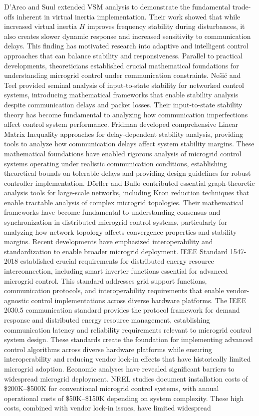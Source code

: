 \documentclass[12pt]{article}
\begin{document}
D'Arco and Suul \cite{darco2013} extended VSM analysis to demonstrate the fundamental trade-offs inherent in virtual inertia implementation. Their work showed that while increased virtual inertia $H$ improves frequency stability during disturbances, it also creates slower dynamic response and increased sensitivity to communication delays. This finding has motivated research into adaptive and intelligent control approaches that can balance stability and responsiveness. Parallel to practical developments, theoreticians established crucial mathematical foundations for understanding microgrid control under communication constraints. Nešić and Teel \cite{nesic2004} provided seminal analysis of input-to-state stability for networked control systems, introducing mathematical frameworks that enable stability analysis despite communication delays and packet losses. Their input-to-state stability theory has become fundamental to analyzing how communication imperfections affect control system performance. Fridman \cite{fridman2014} developed comprehensive Linear Matrix Inequality approaches for delay-dependent stability analysis, providing tools to analyze how communication delays affect system stability margins. These mathematical foundations have enabled rigorous analysis of microgrid control systems operating under realistic communication conditions, establishing theoretical bounds on tolerable delays and providing design guidelines for robust controller implementation. Dörfler and Bullo \cite{dorfler2013} contributed essential graph-theoretic analysis tools for large-scale networks, including Kron reduction techniques that enable tractable analysis of complex microgrid topologies. Their mathematical frameworks have become fundamental to understanding consensus and synchronization in distributed microgrid control systems, particularly for analyzing how network topology affects convergence properties and stability margins. Recent developments have emphasized interoperability and standardization to enable broader microgrid deployment. IEEE Standard 1547-2018 \cite{ieee1547} established crucial requirements for distributed energy resource interconnection, including smart inverter functions essential for advanced microgrid control. This standard addresses grid support functions, communication protocols, and interoperability requirements that enable vendor-agnostic control implementations across diverse hardware platforms. The IEEE 2030.5 communication standard \cite{ieee2030} provides the protocol framework for demand response and distributed energy resource management, establishing communication latency and reliability requirements relevant to microgrid control system design. These standards create the foundation for implementing advanced control algorithms across diverse hardware platforms while ensuring interoperability and reducing vendor lock-in effects that have historically limited microgrid adoption. Economic analyses have revealed significant barriers to widespread microgrid deployment. NREL studies \cite{anderson2021,hirsch2018} document installation costs of \$200K--\$500K for conventional microgrid control systems, with annual operational costs of \$50K--\$150K depending on system complexity. These high costs, combined with vendor lock-in issues, have limited widespread 
\end{document}
